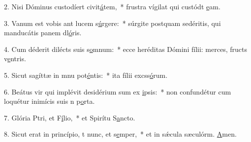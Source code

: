 2. Nisi Dóminus custodíert civit\uline{á}tem,~* frustra vígilat qui custódt \uline{e}am.\par 
3. Vanum est vobis ant lucem s\uline{ú}rgere:~* súrgite postquam sedéritis, qui manducátis panem dl\uline{ó}ris.\par 
4. Cum déderit dilécts suis s\uline{o}mnum:~* ecce heréditas Dómini fílii: merces, fructs v\uline{e}ntris.\par 
5. Sicut sagíttæ in mnu pot\uline{é}ntis:~* ita fílii excss\uline{ó}rum.\par 
6. Beátus vir qui implévit desidérium sum ex \uline{i}psis:~* non confundétur cum loquétur inimícis suis n p\uline{o}rta.\par 
7. Glória Ptri, et F\uline{í}lio,~* et Spirítu S\uline{a}ncto.\par 
8. Sicut erat in princípio, t nunc, et s\uline{e}mper,~* et in sǽcula sæculórm. \uline{A}men.\par 
